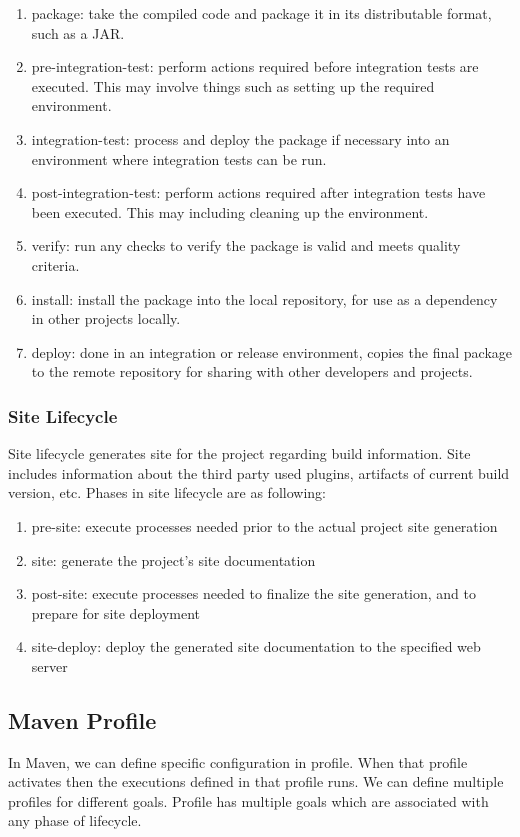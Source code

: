 \documentclass[a4paper,oneside,1,english1pt]{report}
\begin{document}
\begin{enumerate}
					\item package: 	take the compiled code and package it in its distributable format, such as a JAR.
					\item pre-integration-test: 	perform actions required before integration tests are executed. This may involve things such as setting up the required environment.
					\item integration-test: 	process and deploy the package if necessary into an environment where integration tests can be run.
					\item post-integration-test: 	perform actions required after integration tests have been executed. This may including cleaning up the environment.
					\item verify: 	run any checks to verify the package is valid and meets quality criteria.
					\item install: 	install the package into the local repository, for use as a dependency in other projects locally.
					\item deploy: 	done in an integration or release environment, copies the final package to the remote repository for sharing with other developers and projects.
					
					
				\end{enumerate}
			\subsubsection{Site Lifecycle}
			\par Site lifecycle generates site for the project regarding build information. Site includes information about the third party used plugins, artifacts of current build version, etc. Phases in site lifecycle are as following:
				\begin{enumerate}
					\item pre-site: 	execute processes needed prior to the actual project site generation
					\item site: 	generate the project's site documentation
					\item post-site: 	execute processes needed to finalize the site generation, and to prepare for site deployment
					\item site-deploy: deploy the generated site documentation to the specified web server
				\end{enumerate}
	\subsection{Maven Profile}
	\label{maven:profile}
		\par In Maven, we can define specific configuration in profile. When that profile activates then the executions defined in that profile runs. We can define multiple profiles for different goals. Profile has multiple goals which are associated with any phase of lifecycle.\\
		
\end{document}

